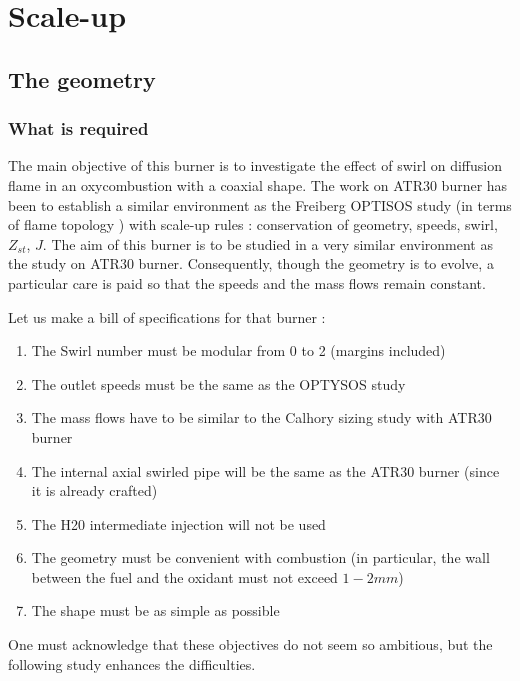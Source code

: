 \renewcommand\evenpagerightmark{{\scshape\small Scale-up}}
\chapter[Scale-up]%
{Scale-up}
\label{Scale-up}

\section{The geometry}
\subsection{What is required}

The main objective of this burner is to investigate the effect of swirl on diffusion flame in an oxycombustion with a coaxial shape. The  work on ATR30 burner has been to establish a similar environment as the Freiberg OPTISOS study (in terms of flame topology ) with scale-up rules : conservation of geometry, speeds, swirl, $Z_{st}$, $J$. The aim of this burner is to be studied in a very similar environment as the study on ATR30 burner. Consequently, though the geometry is to evolve, a particular care is paid so that the speeds and the mass flows remain constant.

Let us make a bill of specifications for that burner :
\begin{enumerate}
\item The Swirl number must be modular from 0 to 2 (margins included)
\item The outlet speeds must be the same as the OPTYSOS study
\item The mass flows have to be similar to the Calhory sizing study with ATR30 burner
\item The internal axial swirled pipe will be the same as the ATR30 burner (since it is already crafted)
\item The H20 intermediate injection will not be used
\item The geometry must be convenient with combustion (in particular, the wall between the fuel and the oxidant must not exceed $1-2mm$)  
\item The shape must be as simple as possible
\end{enumerate}
One must acknowledge that these objectives do not seem so ambitious, but the following study enhances the difficulties.

